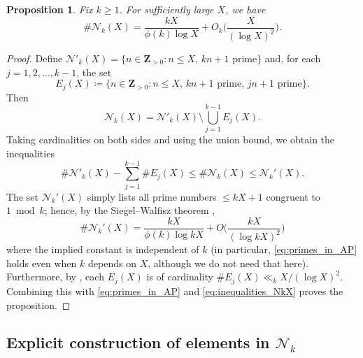 \documentclass[12pt,reqno]{amsart}
\theoremstyle{definition}
\theoremstyle{plain}
\newtheorem{proposition}[theorem]{Proposition}
\theoremstyle{definition}
\newcommand{\Z}{\mathbf{Z}}
\newcommand\NN{{\mathcal N}}
\renewcommand{\geq}{\geqslant}
\renewcommand{\leq}{\leqslant}
\begin{document}
\begin{proposition} 
\label{nnkinf} 
Fix $k \geq 1$. For sufficiently large $X$, we have
$$
\# \mathcal{N}_k(X) = \frac{kX}{\phi(k) \log{X}} + O_k \Big( \frac{X}{(\log{X})^2} \Big).
$$
\end{proposition} 
\begin{proof}
Define $\mathcal{N}'_k(X) = \{n \in \Z_{>0} : n \leq X, \, kn + 1 \text{ prime}\}$ and, for each $j=1,2,\ldots, k-1$, the set
\begin{equation*}
E_j(X) \coloneqq  \{n \in \Z_{>0} : n \leq X, \, kn + 1 \text{ prime}, \, jn + 1 \text{ prime}\}.
\end{equation*}
Then
$$\mathcal{N}_k(X) = \mathcal{N}'_k(X) \setminus \bigcup_{j=1}^{k-1} E_j(X).$$
Taking cardinalities on both sides and using the union bound, we obtain the inequalities
\begin{equation}
\label{eq:inequalities_NkX}
\# \mathcal{N}'_k(X) - \sum_{j=1}^{k-1} \# E_j(X) \leq \# \mathcal{N}_k(X) \leq \mathcal{N}_k'(X).
\end{equation}
The set $\mathcal{N}_k'(X)$ simply lists all prime numbers $\leq kX+1$ congruent to $1 \bmod{k}$; hence, by the Siegel--Walfisz theorem \cite[Corollary 5.29]{IK},
\begin{equation}
\label{eq:primes_in_AP}
\# \mathcal{N}_k'(X) = \frac{kX}{\phi(k) \log{kX}} + O \Big( \frac{kX}{(\log{kX})^2} \Big)
\end{equation}
where the implied constant is independent of $k$ (in particular, \eqref{eq:primes_in_AP} holds even when $k$ depends on $X$, although we do not need that here). Furthermore, by \cite[Lemma~5.1]{Ford-et-al}, each $E_j(X)$ is of cardinality $ \# E_j(X) \ll_k X/(\log{X})^2$. Combining this with \eqref{eq:primes_in_AP} and \eqref{eq:inequalities_NkX} proves the proposition.
\end{proof}
  
\subsection{Explicit construction of elements in $\NN_k$} 
 
\end{document}
